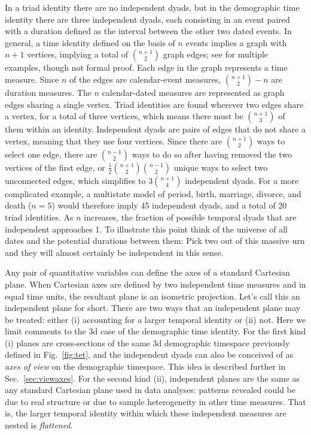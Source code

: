 \documentclass{bmcart}
\begin{document}
 In a triad identity there are no independent dyads, but in the demographic time identity there are three independent dyads, each consisting in an event paired with a duration defined as the interval between the other two dated events. In general, a time identity defined on the basis of $n$ events implies a graph with $n+1$ vertices, implying a total of $\binom{n+1}{2}$ graph edges; see \citet{riffe2017demographictime} for multiple examples, though not formal proof. Each edge in the graph represents a time measure. Since $n$ of the edges are calendar-event measures, $\binom{n+1}{2} - n$ are duration measures. The $n$ calendar-dated measures are represented as graph edges sharing a single vertex. Triad identities are found wherever two edges share a vertex, for a total of three vertices, which means there must be $\binom{n+1}{3}$ of them within an identity. Independent dyads are pairs of edges that do not share a vertex, meaning that they use four vertices. Since there are $\binom{n+1}{2}$ ways to select one edge, there are $\binom{n-1}{2}$ ways to do so after having removed the two vertices of the first edge, or $\frac{1}{2}\binom{n+1}{2}\binom{n-1}{2}$ unique ways to select two unconnected edges, which simplifies to $3\binom{n+1}{4}$ independent dyads. For a more complicated example, a multistate model of period, birth, marriage, divorce, and death ($n=5$) would therefore imply 45 independent dyads, and a total of 20 triad identities. As $n$ increases, the fraction of possible temporal dyads that are independent approaches 1. To illustrate this point think of the universe of all dates and the potential durations between them: Pick two out of this massive urn and they will almost certainly be independent in this sense.

Any pair of quantitative variables can define the axes of a standard Cartesian plane. When Cartesian axes are defined by two independent time measures and in equal time units, the resultant plane is an isometric projection. Let's call this an independent plane for short. There are two ways that an independent plane may be treated: either (i) accounting for a larger temporal identity or (ii) not. Here we limit comments to the 3d case of the demographic time identity. For the first kind (i) planes are cross-sections of the same 3d demographic timespace previously defined in Fig.~\ref{fig:tet}, and the independent dyads can also be conceived of as \emph{axes of view} on the demographic timespace. This idea is described further in Sec.~\ref{sec:viewaxes}. For the second kind (ii), independent planes are the same as any standard Cartesian plane used in data analyses: patterns revealed could be due to real structure or due to sample heterogeneity in other time measures. That is, the larger temporal identity within which these independent measures are nested is \emph{flattened}.
\end{document}

